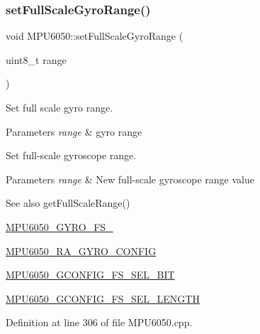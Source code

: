 \subsubsection{\texorpdfstring{setFullScaleGyroRange()}{setFullScaleGyroRange()}}
{\footnotesize\ttfamily void M\+P\+U6050\+::set\+Full\+Scale\+Gyro\+Range (\begin{DoxyParamCaption}\item[{uint8\+\_\+t}]{range }\end{DoxyParamCaption})}

Set full scale gyro range.


\begin{DoxyParams}{Parameters}
{\em range} & gyro range\\
\hline
\end{DoxyParams}
Set full-\/scale gyroscope range. 
\begin{DoxyParams}{Parameters}
{\em range} & New full-\/scale gyroscope range value \\
\hline
\end{DoxyParams}
\begin{DoxySeeAlso}{See also}
get\+Full\+Scale\+Range() 

\mbox{\hyperlink{MPU6050_8h_aac5b35a3fa5792b38fe7118bc72fb442}{M\+P\+U6050\+\_\+\+G\+Y\+R\+O\+\_\+\+F\+S\+\_}} 

\mbox{\hyperlink{MPU6050_8h_a004871ad77398075d79e9111989007dc}{M\+P\+U6050\+\_\+\+R\+A\+\_\+\+G\+Y\+R\+O\+\_\+\+C\+O\+N\+F\+IG}} 

\mbox{\hyperlink{MPU6050_8h_afd6d2bc756768007166a6c3941569c80}{M\+P\+U6050\+\_\+\+G\+C\+O\+N\+F\+I\+G\+\_\+\+F\+S\+\_\+\+S\+E\+L\+\_\+\+B\+IT}} 

\mbox{\hyperlink{MPU6050_8h_a9ffad45588f9e6c49842bbe8c57335f6}{M\+P\+U6050\+\_\+\+G\+C\+O\+N\+F\+I\+G\+\_\+\+F\+S\+\_\+\+S\+E\+L\+\_\+\+L\+E\+N\+G\+TH}} 
\end{DoxySeeAlso}


Definition at line 306 of file M\+P\+U6050.\+cpp.


\begin{DoxyCode}{0}

\end{DoxyCode}
\mbox{\label{classMPU6050_aa828160756a50f414aa3f5f5f0353c70}} 
